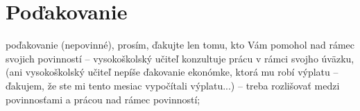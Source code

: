 \thispagestyle{empty}
\vspace*{\fill}
\section*{Poďakovanie}
poďakovanie (nepovinné), prosím, ďakujte len tomu, kto Vám pomohol nad rámec svojich povinností – vysokoškolský učiteľ konzultuje prácu v rámci svojho úväzku, (ani vysokoškolský učiteľ nepíše ďakovanie ekonómke, ktorá mu robí výplatu –ďakujem, že ste mi tento mesiac vypočítali výplatu...) – treba rozlišovať medzi povinnosťami a prácou nad rámec povinností;
\vspace{3cm}